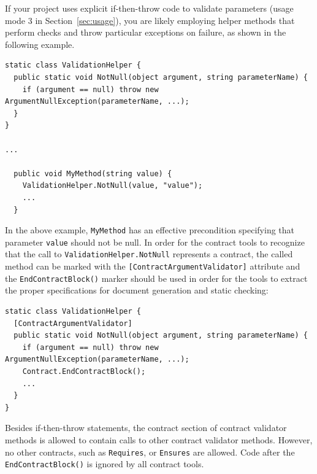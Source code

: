 \documentclass{article}
\newcommand{\code}[1]{\lstinline{#1}}
\begin{document}
\noindent If your project uses explicit if-then-throw code to validate
parameters (usage mode 3 in Section~\ref{sec:usage}), you are
likely employing helper methods that perform checks and throw particular
exceptions on failure, as shown in the following example.
\begin{lstlisting}
static class ValidationHelper {
  public static void NotNull(object argument, string parameterName) {
    if (argument == null) throw new ArgumentNullException(parameterName, ...);
  }
}

...

  public void MyMethod(string value) {
    ValidationHelper.NotNull(value, "value");
    ...
  }
\end{lstlisting}
\noindent
In the above example, \code{MyMethod} has an effective precondition
specifying that parameter \code{value} should not be null. In order for
the contract tools to recognize that the call to \code{ValidationHelper.NotNull}
represents a contract, the called method can be marked with the
\code{[ContractArgumentValidator]} attribute and the
\code{EndContractBlock()} marker should be used in order for the tools
to extract the proper specifications for document generation and
static checking:
\begin{lstlisting}
static class ValidationHelper {
  [ContractArgumentValidator]
  public static void NotNull(object argument, string parameterName) {
    if (argument == null) throw new ArgumentNullException(parameterName, ...);
    Contract.EndContractBlock();
    ...
  }
}
\end{lstlisting}
Besides if-then-throw statements, the contract section of contract validator methods is
allowed to contain calls to other contract validator methods. However,
no other contracts, such as \code{Requires}, or \code{Ensures} are allowed.
Code after the \code{EndContractBlock()} is ignored by all contract tools.
\end{document}
